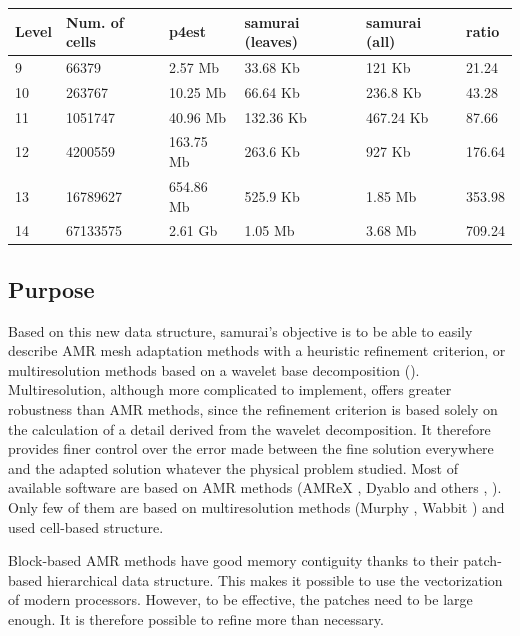 \begin{table}[h!]
    \centering
    \begin{tabular}{llllll}
        \textbf{Level} & \textbf{Num. of cells} & \textbf{p4est} & \textbf{samurai (leaves)} & \textbf{samurai (all)} & \textbf{ratio} \\
        \hline\hline
        9 & 66379 & 2.57 Mb & 33.68 Kb & 121 Kb & 21.24 \\
        10 & 263767 & 10.25 Mb & 66.64 Kb & 236.8 Kb & 43.28 \\
        11 & 1051747 & 40.96 Mb & 132.36 Kb & 467.24 Kb & 87.66 \\
        12 & 4200559 & 163.75 Mb & 263.6 Kb & 927 Kb & 176.64 \\
        13 & 16789627 & 654.86 Mb & 525.9 Kb & 1.85 Mb & 353.98 \\
        14 & 67133575 & 2.61 Gb & 1.05 Mb & 3.68 Mb & 709.24 \\
    \end{tabular}
\end{table}

\subsection{Purpose}
\label{sec:Samurai:purpose}

Based on this new data structure, samurai's objective is to be able to easily describe AMR mesh adaptation methods with a heuristic refinement criterion, or multiresolution methods based on a wavelet base decomposition (\cite{cohen_fully_2003}). Multiresolution, although more complicated to implement, offers greater robustness than AMR methods, since the refinement criterion is based solely on the calculation of a detail derived from the wavelet decomposition. It therefore provides finer control over the error made between the fine solution everywhere and the adapted solution whatever the physical problem studied. Most of available software are based on AMR methods (AMReX \cite{zhang_amrex_2021}, Dyablo \cite{delorme_novel_nodate} and others , \cite{dubey_survey_2014-1}). Only few of them are based on multiresolution methods (Murphy \cite{gillis_murphy---scalable_2022}, Wabbit \cite{krah_wavelet_2022}) and used cell-based structure.

Block-based AMR methods have good memory contiguity thanks to their patch-based hierarchical data structure. This makes it possible to use the vectorization of modern processors. However, to be effective, the patches need to be large enough. It is therefore possible to refine more than necessary.

